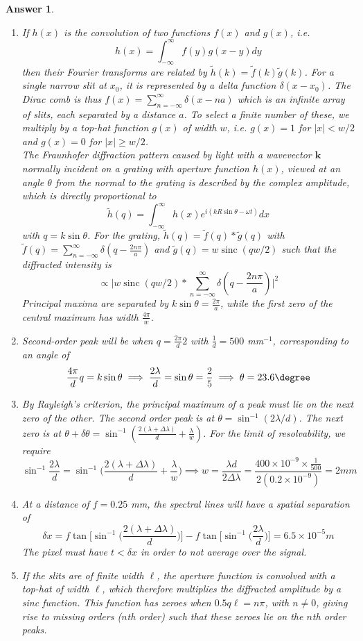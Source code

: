 \documentclass[a4paper]{article}
\DeclareMathOperator{\sinc}{sinc}
\newtheorem{ans}{Answer}[subsection]
\theoremstyle{new}
\begin{document}
\begin{ans}\leavevmode
\begin{enumerate}[label=(\roman*)]
\item If $h(x)$ is the convolution of two functions $f(x)$ and $g(x)$, i.e.
$$h(x)=\int_{-\infty}^\infty f(y)g(x-y)dy$$
then their Fourier transforms are related by $\tilde{h}(k)=\tilde{f}(k)\tilde{g}(k)$. For a single narrow slit at $x_0$, it is represented by a delta function $\delta(x-x_0)$. The Dirac comb is thus $f(x)=\sum_{n=-\infty}^\infty\delta(x-na)$ which is an infinite array of slits, each separated by a distance $a$. To select a finite number of these, we multiply by a top-hat function $g(x)$ of width $w$, i.e. $g(x)=1$ for $|x|<w/2$ and $g(x)=0$ for $|x|\geq w/2$.\\[5pt]
The Fraunhofer diffraction pattern caused by light with a wavevector $\mathbf{k}$ normally incident on a grating with aperture function $h(x)$, viewed at an angle $\theta$ from the normal to the grating is described by the complex amplitude, which is directly proportional to
$$\tilde{h}(q)=\int_{-\infty}^\infty h(x)e^{i(kR\sin\theta-\omega t)}dx$$
with $q=k\sin\theta$. For the grating, $\tilde{h}(q)=\tilde{f}(q)*\tilde{g}(q)$ with $\tilde{f}(q)=\sum_{n=-\infty}^\infty\delta(q-\frac{2n\pi}{a})$ and $\tilde{g}(q)=w\sinc(qw/2)$ such that the diffracted intensity is 
$$\propto\bigg|w\sinc(qw/2)*\sum_{n=-\infty}^\infty\delta(q-\frac{2n\pi}{a})\bigg|^2$$
Principal maxima are separated by $k\sin\theta=\frac{2\pi}{a}$, while the first zero of the central maximum has width $\frac{4\pi}{w}$.
\item Second-order peak will be when $q=\frac{2\pi}{d}2$ with $\frac{1}{d}=500$ mm$^{-1}$, corresponding to an angle of
$$\frac{4\pi}{d}q=k\sin\theta\implies\frac{2\lambda}{d}=\sin\theta=\frac{2}{5}\implies\theta=23.6\degree$$
\item By Rayleigh's criterion, the principal maximum of a peak must lie on the next zero of the other. The second order peak is at $\theta=\sin^{-1}(2\lambda/d)$. The next zero is at $\theta+\delta\theta=\sin^{-1}(\frac{2(\lambda+\Delta\lambda)}{d}+\frac{\lambda}{w})$. For the limit of resolvability, we require
$$\sin^{-1}\frac{2\lambda}{d}=\sin^{-1}\bigg(\frac{2(\lambda+\Delta\lambda)}{d}+\frac{\lambda}{w}\bigg)\implies w=\frac{\lambda d}{2\Delta\lambda}=\frac{400\times10^{-9}\times\frac{1}{500}}{2(0.2\times10^{-9})}=2 mm$$
\item At a distance of $f=0.25$ mm, the spectral lines will have a spatial separation of
$$\delta x=f\tan\bigg[\sin^{-1}\bigg(\frac{2(\lambda+\Delta\lambda)}{d}\bigg)\bigg]-f\tan\bigg[\sin^{-1}\bigg(\frac{2\lambda}{d}\bigg)\bigg]=6.5\times10^{-5} m$$
The pixel must have $t<\delta x$ in order to not average over the signal.
\item If the slits are of finite width $\ell$, the aperture function is convolved with a top-hat of width $\ell$, which therefore multiplies the diffracted amplitude by a sinc function. This function has zeroes when $0.5q\ell=n\pi$, with $n\neq 0$, giving rise to missing orders ($n$th order) such that these zeroes lie on the $n$th order peaks.
\end{enumerate}
\end{ans}
\end{document}
